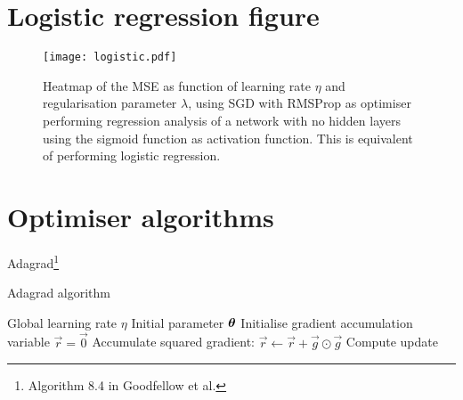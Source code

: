 \clearpage

\section{Logistic regression figure}\label{app:logistic}

\begin{figure}[h!]
    \texttt{[image: logistic.pdf]}
    \caption{Heatmap of the MSE as function of learning rate $\eta$ and regularisation parameter $\lambda$, using SGD with RMSProp as optimiser performing regression analysis of a network with no hidden layers using the sigmoid function as activation function. This is equivalent of performing logistic regression.}
    \label{fig:logistic_eta_lambda}
\end{figure}


\clearpage

\section{Optimiser algorithms}\label{app:optimisers}


Adagrad\footnote{Algorithm 8.4 in Goodfellow et al.}

\begin{algorithm}
\caption{Adagrad algorithm}\label{algo:adagrad}
\begin{algorithmic}
    \Require Global learning rate $\eta$
    \Require Initial parameter $\boldsymbol{\theta}$
    \Ensure Initialise gradient accumulation variable $\vec{r} = \vec{0}$
        \State Accumulate squared gradient: $\vec{r} \leftarrow \vec{r} + \vec{g}\odot\vec{g}$
        \State Compute update 
    \EndWhile
\end{algorithmic}
\end{algorithm}




